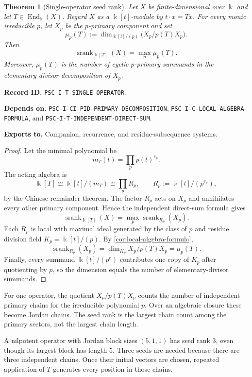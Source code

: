 \documentclass[11pt]{article}
\newtheorem{theorem}{Theorem}[section]
\theoremstyle{definition}
\theoremstyle{remark}
\newcommand{\bbk}{\Bbbk}
\newcommand{\srank}{\operatorname{srank}}
\newcommand{\End}{\operatorname{End}}
\newcommand{\RecordID}[1]{\par\smallskip\noindent\begingroup\footnotesize\color{PSCGray}\raggedright\textbf{Record ID.} \nolinkurl{#1}.\par\endgroup}
\newcommand{\Depends}[1]{\par\noindent\begingroup\footnotesize\color{PSCGray}\raggedright\textbf{Depends on.} #1\par\endgroup}
\newcommand{\Exports}[1]{\par\noindent\begingroup\footnotesize\color{PSCGray}\raggedright\textbf{Exports to.} #1\par\endgroup}
\begin{document}
\begin{theorem}[Single-operator seed rank]
\label{thm:single-operator}
Let $X$ be finite-dimensional over $\bbk$ and let $T\in\End_{\bbk}(X)$.  Regard $X$ as a $\bbk[t]$-module by $t\cdot x=Tx$.  For every monic irreducible $p$, let $X_p$ be the $p$-primary component and set
\[
\mu_p(T):=
\dim_{\bbk[t]/(p)}\bigl(X_p/p(T)X_p\bigr).
\]
Then
\[
\boxed{
\srank_{\bbk[T]}(X)=\max_p\mu_p(T).
}
\]
Moreover, $\mu_p(T)$ is the number of cyclic $p$-primary summands in the elementary-divisor decomposition of $X_p$.
\end{theorem}
\RecordID{PSC-I-T-SINGLE-OPERATOR}
\Depends{\nolinkurl{PSC-I-CI-PID-PRIMARY-DECOMPOSITION},
\nolinkurl{PSC-I-C-LOCAL-ALGEBRA-FORMULA}, and
\nolinkurl{PSC-I-T-INDEPENDENT-DIRECT-SUM}.}
\Exports{Companion, recurrence, and residue-subsequence systems.}

\begin{proof}
Let the minimal polynomial be
\[
m_T(t)=\prod_{p}p(t)^{e_p}.
\]
The acting algebra is
\[
\bbk[T]\cong\bbk[t]/(m_T)
\cong\prod_pR_p,
\qquad
R_p:=\bbk[t]/(p^{e_p}),
\]
by the Chinese remainder theorem.  The factor $R_p$ acts on $X_p$ and annihilates every other primary component.  Hence the independent direct-sum formula gives
\[
\srank_{\bbk[T]}(X)=\max_p\srank_{R_p}(X_p).
\]
Each $R_p$ is local with maximal ideal generated by the class of $p$ and residue division field $K_p=\bbk[t]/(p)$.  By \cref{cor:local-algebra-formula},
\[
\srank_{R_p}(X_p)
=
\dim_{K_p}X_p/p(T)X_p
=
\mu_p(T).
\]
Finally, every summand $\bbk[t]/(p^e)$ contributes one copy of $K_p$ after quotienting by $p$, so the dimension equals the number of elementary-divisor summands.
\end{proof}

\begin{interpretation}
For one operator, the quotient \(X_p/p(T)X_p\) counts the number of independent primary chains for the irreducible polynomial \(p\).  Over an algebraic closure these become Jordan chains.  The seed rank is the largest chain count among the primary sectors, not the largest chain length.
\end{interpretation}

\begin{microexample}[title={Block count versus block size}]
A nilpotent operator with Jordan block sizes \((5,1,1)\) has seed rank \(3\), even though its largest block has length \(5\).  Three seeds are needed because there are three independent chains.  Once their initial vectors are chosen, repeated application of \(T\) generates every position in those chains.
\end{microexample}
\end{document}
